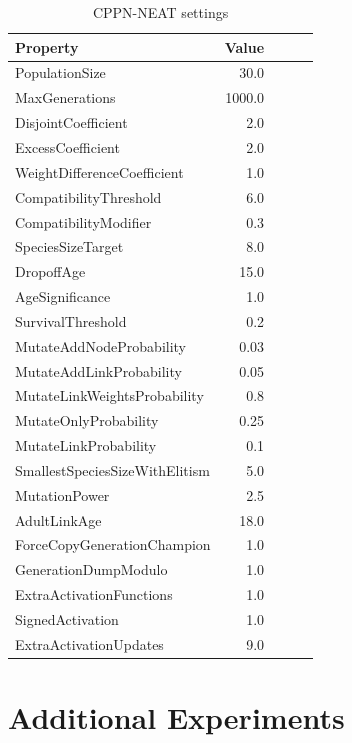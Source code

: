 \begin{table}[ht!]
\centering
\caption{CPPN-NEAT settings}
\label{EvolutionSettingsTable}
    \begin{tabular}{lrrrr}
    \toprule
    \textbf{Property} &  \textbf{Value}\\
    \midrule
    PopulationSize & 30.0\\
    MaxGenerations & 1000.0\\
    DisjointCoefficient & 2.0 \\
    ExcessCoefficient & 2.0 \\
    WeightDifferenceCoefficient & 1.0 \\
    CompatibilityThreshold & 6.0 \\
    CompatibilityModifier & 0.3 \\
    SpeciesSizeTarget & 8.0 \\
    DropoffAge & 15.0 \\
    AgeSignificance &	1.0 \\
    SurvivalThreshold & 0.2 \\
    MutateAddNodeProbability & 0.03 \\
    MutateAddLinkProbability & 0.05 \\
    MutateLinkWeightsProbability & 0.8 \\
    MutateOnlyProbability & 0.25 \\
    MutateLinkProbability & 0.1 \\
    SmallestSpeciesSizeWithElitism & 5.0 \\
    MutationPower & 2.5 \\
    AdultLinkAge & 18.0 \\
    ForceCopyGenerationChampion & 1.0 \\
    GenerationDumpModulo & 1.0 \\
    ExtraActivationFunctions & 1.0 \\
    SignedActivation & 1.0 \\
    ExtraActivationUpdates & 9.0 \\
    \bottomrule
    \end{tabular}
\end{table}


\chapter{Additional Experiments} %
\label{AdditionalExperiments} %


